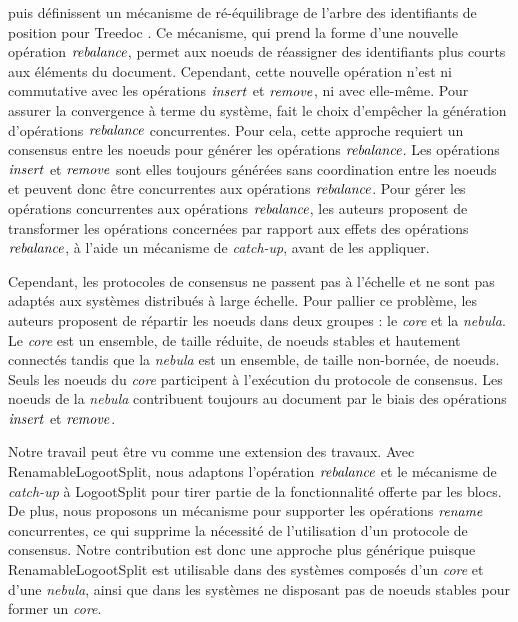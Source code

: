 \cite{letia:hal-01248270} puis \cite{zawirski:hal-01248197} définissent un mécanisme de ré-équilibrage de l'arbre des identifiants de position pour Treedoc \cite{2009-treedoc-preguica}.
Ce mécanisme, qui prend la forme d'une nouvelle opération $\mathit{rebalance}$, permet aux noeuds de réassigner des identifiants plus courts aux éléments du document.
Cependant, cette nouvelle opération n'est ni commutative avec les opérations $\mathit{insert}$ et $\mathit{remove}$, ni avec elle-même.
Pour assurer la convergence à terme \cite{10.1145/224057.224070} du système, \cite{zawirski:hal-01248197} fait le choix d'empêcher la génération d'opérations $\mathit{rebalance}$ concurrentes.
Pour cela, cette approche requiert un consensus entre les noeuds pour générer les opérations $\mathit{rebalance}$.
Les opérations $\mathit{insert}$ et $\mathit{remove}$ sont elles toujours générées sans coordination entre les noeuds et peuvent donc être concurrentes aux opérations $\mathit{rebalance}$.
Pour gérer les opérations concurrentes aux opérations $\mathit{rebalance}$, les auteurs proposent de transformer les opérations concernées par rapport aux effets des opérations$\mathit{rebalance}$, à l'aide un mécanisme de \emph{catch-up}, avant de les appliquer.

Cependant, les protocoles de consensus ne passent pas à l'échelle et ne sont pas adaptés aux systèmes distribués à large échelle.
Pour pallier ce problème, les auteurs proposent de répartir les noeuds dans deux groupes : le \emph{core} et la \emph{nebula}.
Le \emph{core} est un ensemble, de taille réduite, de noeuds stables et hautement connectés tandis que la \emph{nebula} est un ensemble, de taille non-bornée, de noeuds.
Seuls les noeuds du \emph{core} participent à l'exécution du protocole de consensus.
Les noeuds de la \emph{nebula} contribuent toujours au document par le biais des opérations $\mathit{insert}$ et $\mathit{remove}$.

Notre travail peut être vu comme une extension des travaux.
Avec RenamableLogootSplit, nous adaptons l'opération $\mathit{rebalance}$ et le mécanisme de \emph{catch-up} à LogootSplit pour tirer partie de la fonctionnalité offerte par les blocs.
De plus, nous proposons un mécanisme pour supporter les opérations $\mathit{rename}$ concurrentes, ce qui supprime la nécessité de l'utilisation d'un protocole de consensus.
Notre contribution est donc une approche plus générique puisque RenamableLogootSplit est utilisable dans des systèmes composés d'un \emph{core} et d'une \emph{nebula}, ainsi que dans les systèmes ne disposant pas de noeuds stables pour former un \emph{core}.

